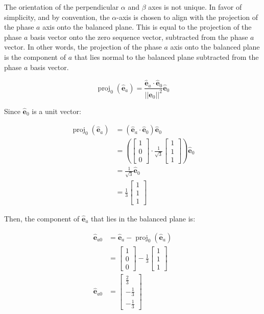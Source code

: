 \documentclass{article}
\begin{document}
The orientation of the perpendicular $\alpha$ and $\beta$ axes is not unique. In favor of simplicity, and by convention, the $\alpha$-axis is chosen to align with the projection of the phase $a$ axis onto the balanced plane. This is equal to the projection of the phase $a$ basis vector onto the zero sequence vector, subtracted from the phase $a$ vector. In other words, the projection of the phase $a$ axis onto the balanced plane is the component of $a$ that lies normal to the balanced plane subtracted from the phase $a$ basis vector. 

\begin{equation}
    \operatorname{proj}_0(\hat{\mathbf e}_a) = \frac{\mathbf{\hat{e}}_a \cdot \mathbf{\hat{e}}_0}{||\mathbf{\hat{e}}_0||^2} \mathbf{\hat{e}}_0
\end{equation}

Since $\mathbf{\hat{e}}_0$ is a unit vector:

\begin{align}
    \operatorname{proj}_0(\hat{\mathbf e}_a)
        &= (\hat{\mathbf e}_a \cdot \hat{\mathbf e}_0)\hat{\mathbf e}_0 \\[4pt]
        &= \left(
        \begin{bmatrix}1\\0\\0\end{bmatrix}
        \cdot
        \frac{1}{\sqrt{3}}
        \begin{bmatrix}1\\1\\1\end{bmatrix}
        \right)\hat{\mathbf e}_0 \\[4pt]
        &= \frac{1}{\sqrt{3}}\hat{\mathbf e}_0 \\[4pt]
        &= \frac{1}{3}
        \begin{bmatrix}1\\1\\1\end{bmatrix}
\end{align}

Then, the component of $\mathbf{\hat{e}}_a$ that lies in the balanced plane is:

\begin{align}
    \mathbf{\hat{e}}_{a0} &= \mathbf{\hat{e}}_a - \operatorname{proj}_0(\hat{\mathbf e}_a) \\[4pt]
    &=
    \begin{bmatrix}
        1 \\
        0 \\
        0
    \end{bmatrix}
    - \frac{1}{3}
    \begin{bmatrix}
        1 \\
        1 \\
        1
    \end{bmatrix} \\[4pt]
    \mathbf{\hat{e}}_{a0} &=
    \begin{bmatrix}
        \frac{2}{3} \\
        -\frac{1}{3} \\
        -\frac{1}{3}
    \end{bmatrix}
\end{align}
\end{document}
